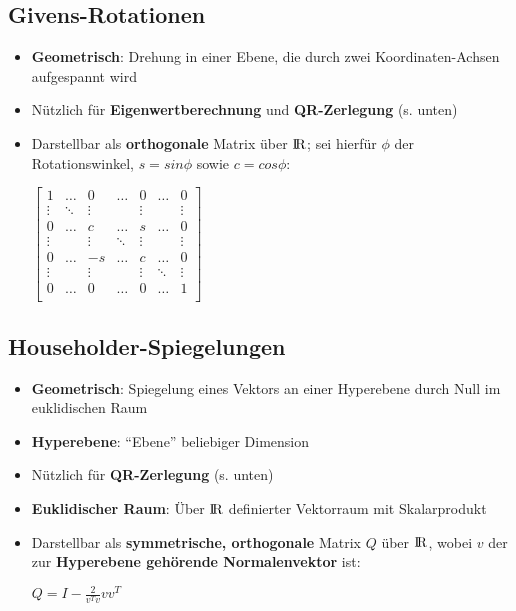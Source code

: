 \documentclass[10pt,a4paper]{article}
\def\realnumbers{{\rm I\!R}}
\newcommand{\quotestyle}[1]{\enquote{#1}}
\begin{document}
	\subsection{Givens-Rotationen}
	\begin{itemize}
		\item \textbf{Geometrisch}: Drehung in einer Ebene, die durch zwei Koordinaten-Achsen aufgespannt wird
		\item Nützlich für \textbf{Eigenwertberechnung} und \textbf{QR-Zerlegung} (s. unten)
		\item Darstellbar als \textbf{orthogonale} Matrix über $\realnumbers$; sei hierfür $\phi$ der Rotationswinkel, $s = sin \phi$ sowie $ c = cos \phi$:
		\begin{center}
			$\begin{bmatrix}
				1 		& \dots 	& 0 	 & \dots 	& 0 	 & \dots 	& 0 	 \\
				\vdots 	& \ddots 	& \vdots & 		 	& \vdots &  	 	& \vdots \\
				0 		& \dots 	& c 	 & \dots 	& s 	 & \dots 	& 0 	 \\
				\vdots 	&			& \vdots & \ddots 	& \vdots &  	 	& \vdots \\
				0 		& \dots 	& -s 	 & \dots 	& c 	 & \dots 	& 0 	 \\
				\vdots 	&			& \vdots & 		 	& \vdots & \ddots 	& \vdots \\
				0 		& \dots 	& 0 	 & \dots 	& 0 	 & \dots 	& 1 	 \\
			\end{bmatrix}$
		\end{center}
	\end{itemize}

    \subsection{Householder-Spiegelungen}
    \begin{itemize}
    	\item \textbf{Geometrisch}: Spiegelung eines Vektors an einer Hyperebene durch Null im euklidischen Raum
    	\item \textbf{Hyperebene}: \quotestyle{Ebene} beliebiger Dimension
		\item Nützlich für \textbf{QR-Zerlegung} (s. unten)
    	\item \textbf{Euklidischer Raum}: Über $\realnumbers$ definierter Vektorraum mit Skalarprodukt
    	\item Darstellbar als \textbf{symmetrische, orthogonale} Matrix $Q$ über $\realnumbers$, wobei $v$ der zur \textbf{Hyperebene gehörende Normalenvektor} ist:
    	\begin{center}
    		$Q = I - \frac{2}{v^Tv}vv^T$
    	\end{center}
    \end{itemize}
\end{document}

